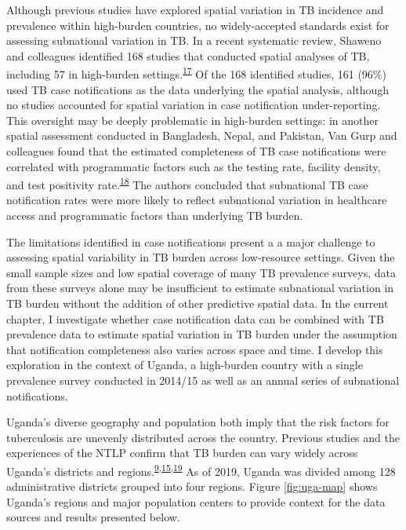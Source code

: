 \documentclass[
]{article}
\begin{document}
Although previous studies have explored spatial variation in TB incidence and prevalence within high-burden countries, no widely-accepted standards exist for assessing subnational variation in TB. In a recent systematic review, Shaweno and colleagues identified 168 studies that conducted spatial analyses of TB, including 57 in high-burden settings.\textsuperscript{\protect\hyperlink{ref-Shaweno2018}{17}} Of the 168 identified studies, 161 (96\%) used TB case notifications as the data underlying the spatial analysis, although no studies accounted for spatial variation in case notification under-reporting. This oversight may be deeply problematic in high-burden settings: in another spatial assessment conducted in Bangladesh, Nepal, and Pakistan, Van Gurp and colleagues found that the estimated completeness of TB case notifications were correlated with programmatic factors such as the testing rate, facility density, and test positivity rate.\textsuperscript{\protect\hyperlink{ref-VanGurp2020}{18}} The authors concluded that subnational TB case notification rates were more likely to reflect subnational variation in healthcare access and programmatic factors than underlying TB burden.

The limitations identified in case notifications present a a major challenge to assessing spatial variability in TB burden across low-resource settings. Given the small sample sizes and low spatial coverage of many TB prevalence surveys, data from these surveys alone may be insufficient to estimate subnational variation in TB burden without the addition of other predictive spatial data. In the current chapter, I investigate whether case notification data can be combined with TB prevalence data to estimate spatial variation in TB burden under the assumption that notification completeness also varies across space and time. I develop this exploration in the context of Uganda, a high-burden country with a single prevalence survey conducted in 2014/15 as well as an annual series of subnational notifications.

Uganda's diverse geography and population both imply that the risk factors for tuberculosis are unevenly distributed across the country. Previous studies and the experiences of the NTLP confirm that TB burden can vary widely across Uganda's districts and regions.\textsuperscript{\protect\hyperlink{ref-UgandaNationalTuberculosisandLeprosyProgramme2017a}{9},\protect\hyperlink{ref-Karamagi2018}{15},\protect\hyperlink{ref-Kirirabwa2019}{19}} As of 2019, Uganda was divided among 128 administrative districts grouped into four regions. Figure \ref{fig:uga-map} shows Uganda's regions and major population centers to provide context for the data sources and results presented below.
\end{document}
